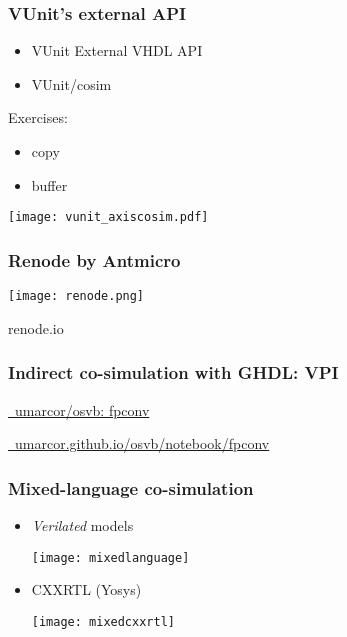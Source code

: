 \documentclass[xcolor={usenames,dvipsnames}]{beamer}
\begin{document}
\begin{frame}
\frametitle{VUnit's external API}
\begin{itemize}
\item VUnit External VHDL API \href{http://vunit.github.io/data_types/user_guide.html\#external-vhdl-api}{\faBook}
\item VUnit/cosim \href{https://vunit.github.io/cosim}{\faBook}
\end{itemize}
\vfill
\begin{minipage}{.3\linewidth}
Exercises:
\begin{itemize}
  \item copy
  \href{https://vunit.github.io/cosim/examples/copy.html}{\faBook}
  \href{https://github.com/VUnit/cosim/tree/master/examples/copy}{\faCode}
  \item buffer
  \href{https://vunit.github.io/cosim/examples/buffer.html}{\faBook}
  \href{https://github.com/VUnit/cosim/tree/master/examples/buffer}{\faCode}
\end{itemize}
\end{minipage}
\begin{minipage}{.65\linewidth}
\texttt{[image: vunit\_axiscosim.pdf]}
\end{minipage}
\end{frame}

\begin{frame}
\frametitle{Renode by Antmicro}
\centering
\texttt{[image: renode.png]}

\vfill
\Large
renode.io
\href{https://renode.io/}{\faGlobe}
\href{https://docs.google.com/presentation/d/1j0gjI4pVkgF9CWvxaxr5XuCKakEB25YX2n-iFxlYKnE}{\faSlideshare}
\end{frame}

\begin{frame}
\frametitle{Indirect co-simulation with GHDL: VPI}
\centering
\Large

\href{https://github.com/umarcor/osvb/tree/main/fpconv}{\faCode~umarcor/osvb: fpconv}

\href{https://umarcor.github.io/osvb/notebook/fpconv.html}{\faGlobe~umarcor.github.io/osvb/notebook/fpconv}

\end{frame}

\begin{frame}
\frametitle{Mixed-language co-simulation}

\begin{itemize}
  \item \emph{Verilated} models

    \vfill
    \texttt{[image: mixedlanguage]}
    \vfill

  \item CXXRTL (Yosys)

    \vfill
    \texttt{[image: mixedcxxrtl]}
    \vfill
\end{itemize}
\end{frame}
\end{document}

